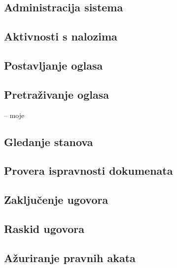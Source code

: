 \documentclass{article}
\begin{document}
\newpage
\subsection{\bfseries Administracija sistema}

\newpage
\subsection{\bfseries Aktivnosti s nalozima}

\newpage
\subsection{\bfseries Postavljanje oglasa}

\newpage
\subsection{\bfseries Pretra\v{z}ivanje oglasa}
-- moje

\newpage
\subsection{\bfseries Gledanje stanova}

\newpage
\subsection{\bfseries Provera ispravnosti dokumenata}

\newpage
\subsection{\bfseries Zaklju\v{c}enje ugovora}

\newpage
\subsection{\bfseries Raskid ugovora}

\newpage
\subsection{\bfseries A\v{z}uriranje pravnih akata}
\end{document}
